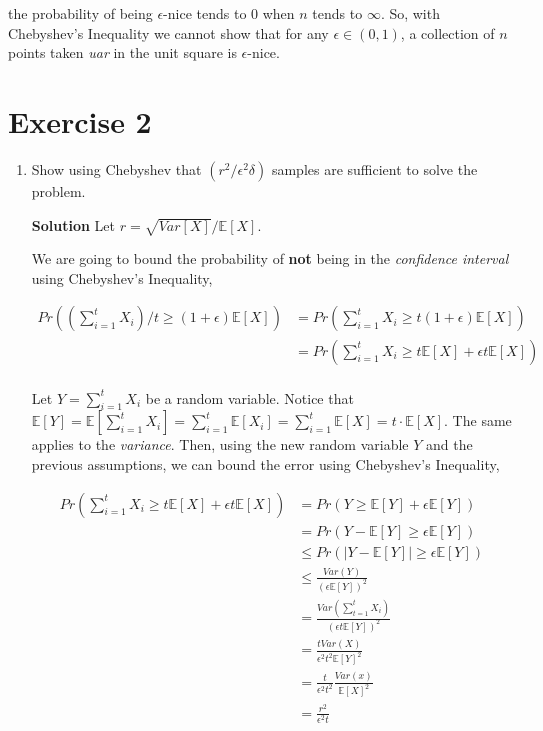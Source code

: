 \documentclass[12pt, a4paper]{article} %
\newcommand\expect[1]{\mathbb{E}[#1]}
\begin{document}
the probability of being $\epsilon$-nice tends to $0$ when $n$ tends to $\infty$. So, with Chebyshev's Inequality we cannot show that for any $\epsilon \in (0,1)$, a collection of $n$ points taken \textit{uar} in the unit square is $\epsilon$-nice.


\section*{Exercise 2}%
\label{sec:exercise_2}

\begin{enumerate}[label=(\alph*)]
  \item Show using Chebyshev that $(r^{2}/\epsilon^{2}\delta)$ samples are sufficient to solve the problem.

  \textbf{Solution} Let $r = \sqrt{Var[X]}/\expect{X}$.

    We are going to bound the probability of \textbf{not} being in the \textit{confidence interval} using Chebyshev's Inequality,

    \begin{align*}
      Pr((\sum_{i=1}^{t}X_{i})/t \ge (1+\epsilon)\expect{X}) &=  Pr(\sum_{i=1}^{t}X_{i} \ge t(1+\epsilon)\expect{X}) \\
      &= Pr(\sum_{i=1}^{t}X_{i} \ge t\expect{X} + \epsilon t \expect{X}) \\
    \end{align*}

    Let $Y = \sum_{i=1}^{t}X_{i}$ be a random variable. Notice that $\expect{Y} = \expect{\sum_{i=1}^{t}X_{i}} = \sum_{i=1}^{t}\expect{X_{i}} = \sum_{i=1}^{t}\expect{X} = t \cdot \expect{X}$. The same applies to the \textit{variance}.
    Then, using the new random variable $Y$ and the previous assumptions, we can bound the error using Chebyshev's Inequality,


    \begin{align*}
      Pr(\sum_{i=1}^{t}X_{i} \ge t\expect{X} + \epsilon t \expect{X}) &= Pr (Y \ge \expect{Y} + \epsilon \expect{Y}) \\
      &= Pr (Y - \expect{Y} \ge \epsilon \expect{Y}) \\
      &\le Pr (|Y - \expect{Y}| \ge \epsilon \expect{Y}) \\
      &\le \frac{Var(Y)}{(\epsilon \expect{Y})^{2}} \\
      &= \frac{Var(\sum_{t=1}^{t}X_{i})}{(\epsilon t \expect{Y})^{2}} \\
      &= \frac{t Var (X)}{\epsilon^{2} t^{2} \expect{Y}^{2}} \\
      &= \frac{t}{\epsilon^{2} t^{2}} \frac{Var(x)}{\expect{X}^{2}} \\
      &= \frac{r^{2}}{\epsilon^{2} t}
    \end{align*}


\end{enumerate}
\end{document}
